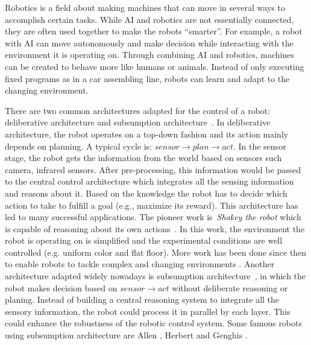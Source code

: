 
Robotics is a field about making machines that can move in several ways to accomplish certain tasks. While AI and robotics are not essentially connected, they are often used together to make the robots ``smarter''. For example, a robot with AI can move autonomously and make decision while interacting with the environment it is operating on. Through combining AI and robotics, machines can be created to behave more like humans or animals. Instead of only executing fixed programs as in a car assembling line, robots can learn and adapt to the changing environment.

There are two common architectures adapted for the control of a robot: deliberative architecture and subsumption architecture~\cite{Brooks1986}. In deliberative architecture, the robot operates on a top-down fashion and its action mainly depends on planning. A typical cycle is: $sensor \rightarrow plan \rightarrow act$. In the sensor stage, the robot gets the information from the world based on sensors such camera, infrared sensors. After pre-processing, this information would be passed to the central control architecture which integrates all the sensing information and reasons about it. Based on the knowledge the robot has to decide which action to take to fulfill a goal (e.g., maximize its reward). This architecture has led to many successful applications. The pioneer work is~\textit{Shakey the robot} which is capable of reasoning about its own actions~\cite{Nilsson1984}. In this work, the environment the robot is operating on is simplified and the experimental conditions are well controlled (e.g. uniform color and flat floor). More work has been done since then to enable robots to tackle complex and changing environments \cite{Dimitrov:ICSMC:2013}. Another architecture adapted widely nowadays is subsumption architecture~\cite{Brooks1986}, in which the robot makes decision based on $sensor \rightarrow act$ without deliberate reasoning or planing. Instead of building a central reasoning system to integrate all the sensory information, the robot could process it in parallel by each layer. This could enhance the robustness of the robotic control system.  Some famous robots using subsumption architecture are Allen \cite{Brooks1986}, Herbert \cite{Buchanan:1984} and Genghis \cite{Brooks:1989}. 
 
